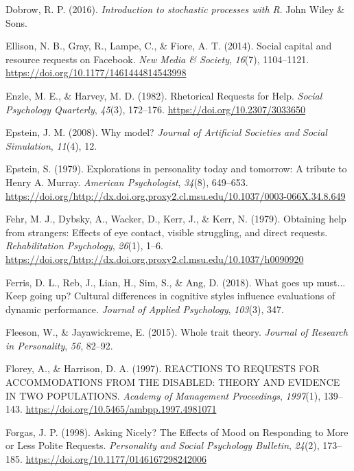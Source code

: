 \documentclass[english,,man]{apa6}
\begin{document}
\leavevmode\hypertarget{ref-dobrow_introduction_2016}{}%
Dobrow, R. P. (2016). \emph{Introduction to stochastic processes with R}. John Wiley \& Sons.

\leavevmode\hypertarget{ref-ellison_social_2014}{}%
Ellison, N. B., Gray, R., Lampe, C., \& Fiore, A. T. (2014). Social capital and resource requests on Facebook. \emph{New Media \& Society}, \emph{16}(7), 1104--1121. \url{https://doi.org/10.1177/1461444814543998}

\leavevmode\hypertarget{ref-enzle_rhetorical_1982}{}%
Enzle, M. E., \& Harvey, M. D. (1982). Rhetorical Requests for Help. \emph{Social Psychology Quarterly}, \emph{45}(3), 172--176. \url{https://doi.org/10.2307/3033650}

\leavevmode\hypertarget{ref-epstein2008model}{}%
Epstein, J. M. (2008). Why model? \emph{Journal of Artificial Societies and Social Simulation}, \emph{11}(4), 12.

\leavevmode\hypertarget{ref-epstein_explorations_1979}{}%
Epstein, S. (1979). Explorations in personality today and tomorrow: A tribute to Henry A. Murray. \emph{American Psychologist}, \emph{34}(8), 649--653. \url{https://doi.org/http://dx.doi.org.proxy2.cl.msu.edu/10.1037/0003-066X.34.8.649}

\leavevmode\hypertarget{ref-fehr_obtaining_1979}{}%
Fehr, M. J., Dybsky, A., Wacker, D., Kerr, J., \& Kerr, N. (1979). Obtaining help from strangers: Effects of eye contact, visible struggling, and direct requests. \emph{Rehabilitation Psychology}, \emph{26}(1), 1--6. \url{https://doi.org/http://dx.doi.org.proxy2.cl.msu.edu/10.1037/h0090920}

\leavevmode\hypertarget{ref-ferris_what_2018}{}%
Ferris, D. L., Reb, J., Lian, H., Sim, S., \& Ang, D. (2018). What goes up must... Keep going up? Cultural differences in cognitive styles influence evaluations of dynamic performance. \emph{Journal of Applied Psychology}, \emph{103}(3), 347.

\leavevmode\hypertarget{ref-fleeson_whole_2015}{}%
Fleeson, W., \& Jayawickreme, E. (2015). Whole trait theory. \emph{Journal of Research in Personality}, \emph{56}, 82--92.

\leavevmode\hypertarget{ref-florey_reactions_1997}{}%
Florey, A., \& Harrison, D. A. (1997). REACTIONS TO REQUESTS FOR ACCOMMODATIONS FROM THE DISABLED: THEORY AND EVIDENCE IN TWO POPULATIONS. \emph{Academy of Management Proceedings}, \emph{1997}(1), 139--143. \url{https://doi.org/10.5465/ambpp.1997.4981071}

\leavevmode\hypertarget{ref-forgas_asking_1998}{}%
Forgas, J. P. (1998). Asking Nicely? The Effects of Mood on Responding to More or Less Polite Requests. \emph{Personality and Social Psychology Bulletin}, \emph{24}(2), 173--185. \url{https://doi.org/10.1177/0146167298242006}
\end{document}
